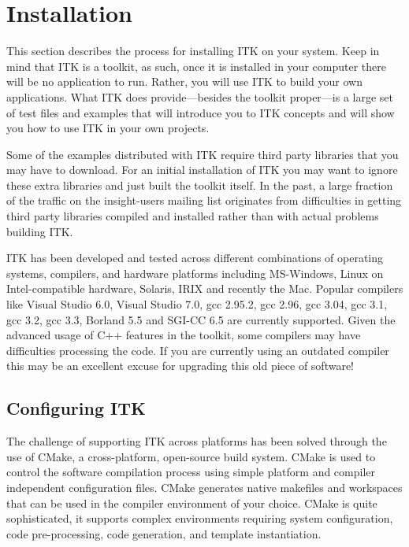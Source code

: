 \chapter{Installation}
\label{chapter:Installation}


This section describes the process for installing ITK on your system. Keep in
mind that ITK is a toolkit, as such, once it is installed in your computer
there will be no application to run. Rather, you will use ITK to build your
own applications. What ITK does provide---besides the toolkit proper---is a
large set of test files and examples that will introduce you to ITK concepts
and will show you how to use ITK in your own projects.

Some of the examples distributed with ITK require third party libraries that
you may have to download. For an initial installation of ITK you may want to
ignore these extra libraries and just built the toolkit itself. In the past,
a large fraction of the traffic on the insight-users mailing list originates from
difficulties in getting third party libraries compiled and installed rather
than with actual problems building ITK.

ITK has been developed and tested across different combinations of operating
systems, compilers, and hardware platforms including MS-Windows, Linux on
Intel-compatible hardware, Solaris, IRIX and recently the Mac. Popular
compilers like Visual Studio 6.0, Visual Studio 7.0, gcc 2.95.2, gcc 2.96,
gcc 3.04, gcc 3.1, gcc 3.2, gcc 3.3, Borland 5.5 and SGI-CC 6.5 are currently
supported. Given the advanced usage of C++ features in the toolkit, some
compilers may have difficulties processing the code. If you are currently
using an outdated compiler this may be an excellent excuse for upgrading this
old piece of software!

\section{Configuring ITK}
\label{sec:ConfiguringITK}

 
The challenge of supporting ITK across platforms has been solved through the
use of CMake, a cross-platform, open-source build system. CMake is used to
control the software compilation process using simple platform and compiler
independent configuration files.  CMake generates native makefiles and
workspaces that can be used in the compiler environment of your choice. CMake
is quite sophisticated, it supports complex environments requiring system
configuration, code pre-processing, code generation, and template
instantiation.

